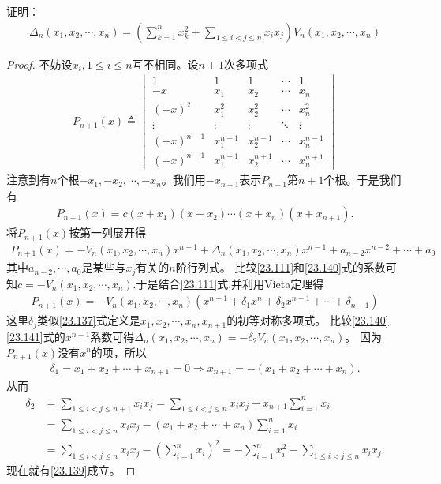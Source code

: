 \documentclass[../../main.tex]{subfiles}
\begin{document}
\begin{example}
证明：
\begin{align}
\Delta_n(x_1,x_2,\cdots,x_n)=\left(\sum_{k = 1}^n x_k^2+\sum_{1\leq i<j\leq n}x_ix_j\right)V_n(x_1,x_2,\cdots,x_n) \label{23.139}
\end{align} 
\end{example}
\begin{proof}
不妨设\(x_i,1\leq i\leq n\)互不相同。设\(n + 1\)次多项式
\begin{align*}
P_{n + 1}(x)\triangleq\begin{vmatrix}
1&1&1&\cdots&1\\
-x&x_1&x_2&\cdots&x_n\\
(-x)^2&x_1^2&x_2^2&\cdots&x_n^2\\
\vdots&\vdots&\vdots&\ddots&\vdots\\
(-x)^{n - 1}&x_1^{n - 1}&x_2^{n - 1}&\cdots&x_n^{n - 1}\\
(-x)^{n + 1}&x_1^{n + 1}&x_2^{n + 1}&\cdots&x_n^{n + 1}
\end{vmatrix}
\end{align*}
注意到有\(n\)个根\(-x_1,-x_2,\cdots,-x_n\)。我们用\(-x_{n + 1}\)表示\(P_{n + 1}\)第\(n + 1\)个根。于是我们有
\begin{align}
P_{n + 1}(x)=c(x + x_1)(x + x_2)\cdots(x + x_n)(x + x_{n + 1}).\label{23.111}
\end{align}
将\(P_{n + 1}(x)\)按第一列展开得
\begin{align}\label{23.140}
P_{n + 1}(x)=-V_n(x_1,x_2,\cdots,x_n)x^{n + 1}+\Delta_n(x_1,x_2,\cdots,x_n)x^{n - 1}+a_{n - 2}x^{n - 2}+\cdots+a_0
\end{align}
其中\(a_{n - 2},\cdots,a_0\)是某些与\(x_j\)有关的\(n\)阶行列式。
比较\eqref{23.111}和\eqref{23.140}式的系数可知\(c = -V_n(x_1,x_2,\cdots,x_n)\).于是结合\eqref{23.111}式,并利用Vieta定理得
\begin{align}\label{23.141}
P_{n + 1}(x)=-V_n(x_1,x_2,\cdots,x_n)(x^{n + 1}+\delta_1x^n+\delta_2x^{n - 1}+\cdots+\delta_{n - 1})
\end{align}
这里\(\delta_j\)类似\eqref{23.137}式定义是\(x_1,x_2,\cdots,x_n,x_{n + 1}\)的初等对称多项式。
比较\eqref{23.140}\eqref{23.141}式的\(x^{n - 1}\)系数可得\(\Delta_n(x_1,x_2,\cdots,x_n)=-\delta_2V_n(x_1,x_2,\cdots,x_n)\)。
因为\(P_{n + 1}(x)\)没有\(x^n\)的项，所以
\begin{align*}
\delta _1=x_1+x_2+\cdots +x_{n+1}=0\Rightarrow x_{n+1}=-\left( x_1+x_2+\cdots +x_n \right) .
\end{align*}
从而
\begin{align*}
\delta _2&=\sum_{1\le i<j\le n+1}{x_ix_j}=\sum_{1\le i<j\le n}{x_ix_j}+x_{n+1}\sum_{i=1}^n{x_i}
\\
&=\sum_{1\le i<j\le n}{x_ix_j}-\left( x_1+x_2+\cdots +x_n \right) \sum_{i=1}^n{x_i}
\\
&=\sum_{1\le i<j\le n}{x_ix_j}-\left( \sum_{i=1}^n{x_i} \right) ^2=-\sum_{i=1}^n{x_{i}^{2}}-\sum_{1\le i<j\le n}{x_ix_j}.
\end{align*}
现在就有\eqref{23.139}成立。 
\end{proof}
\end{document}
